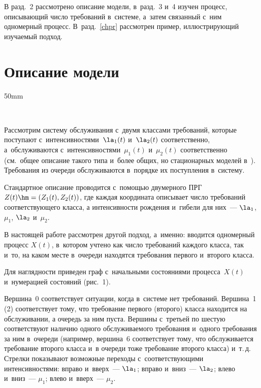 В разд.~2 рассмотрено описание модели, в~разд.~3 и~4 
изучен процесс, описывающий число требований  в~системе, а~затем связанный с~ним одномерный процесс. 
В~разд.~\ref{chpr} рассмотрен пример, иллюстрирующий изучаемый подход.

\section{Описание модели}

\begin{floatingfigure}{50mm} %
\vspace*{1pt}
\begin{center}
 \mbox{%
 \epsfxsize=48mm 
 }
 \end{center}
\vspace*{-9pt}
\vspace*{-9pt}
\end{floatingfigure}

Рассмотрим систему обслуживания с~двумя классами требований, которые 
поступают  с~интенсивностями~$\la_1(t)$ и~$\la_2(t)$ соответственно, а~обслуживаются 
с~интенсивностями~$\mu_1(t)$ и~$\mu_2(t)$ соответственно (см.\ общее описание такого типа 
и~более общих, но стационарных моделей в~\cite{twotreb}). Требования из очереди 
обслуживаются в~порядке их поступления в~систему.


Стандартное описание проводится с~по\-мощью двумерного ПРГ $Z(t)\hm= (Z_1(t),Z_2(t))$, где 
каждая координата описывает число требований соответствующего класса, а  интенсивности 
рождения и~гибели для них~--- $\la_1$, $\mu_1$,  $\la_2$ и~$\mu_2$.


В настоящей работе рассмотрен другой подход, а~именно: 
вводится одномерный процесс $X(t)$, в~котором учтено как число требований 
каждого класса, так и~то, на каком месте в~очереди находятся требования 
первого и~второго класса.

Для наглядности приведен граф с~начальными состояниями процесса~$X(t)$  
и~нумерацией\linebreak
\hspace*{54.2mm}состояний (рис.~1).

Вершина~0  соответствует ситуации, когда в~системе нет требований. 
Вершина~1 (2) соответствует тому, что требование первого (второго) класса находится 
на обслуживании, а очередь за ним пуста. Вершины с~третьей по шестую соответствуют 
наличию одного обслуживаемого требования и~одного требования за ним 
в~очереди (например, вершина~6 соответствует тому, что обслуживается требование
 второго класса и~в очереди тоже требование второго класса) и~т.\,д. 
 Стрелки показывают возможные переходы с~соответствующими интенсивностями: 
 вправо и~вверх~--- $\la_1$; вправо и~вниз~--- $\la_2$; влево и~вниз~--- $\mu_1$; влево и~вверх~--- 
 $\mu_2$.





